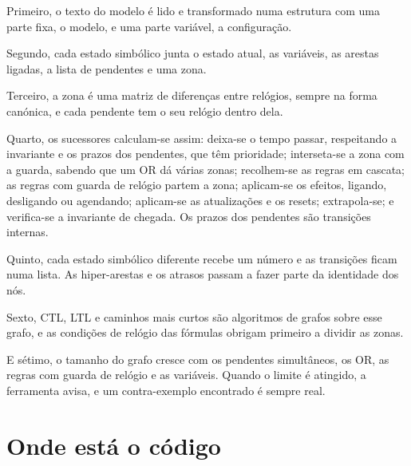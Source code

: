 \documentclass[11pt,a4paper]{article}
\begin{document}
Primeiro, o texto do modelo é lido e transformado numa estrutura com uma parte fixa, o modelo, e uma parte variável, a configuração.

Segundo, cada estado simbólico junta o estado atual, as variáveis, as arestas ligadas, a lista de pendentes e uma zona.

Terceiro, a zona é uma matriz de diferenças entre relógios, sempre na forma canónica, e cada pendente tem o seu relógio dentro dela.

Quarto, os sucessores calculam-se assim: deixa-se o tempo passar, respeitando a invariante e os prazos dos pendentes, que têm prioridade; interseta-se a zona com a guarda, sabendo que um OR dá várias zonas; recolhem-se as regras em cascata; as regras com guarda de relógio partem a zona; aplicam-se os efeitos, ligando, desligando ou agendando; aplicam-se as atualizações e os resets; extrapola-se; e verifica-se a invariante de chegada. Os prazos dos pendentes são transições internas.

Quinto, cada estado simbólico diferente recebe um número e as transições ficam numa lista. As hiper-arestas e os atrasos passam a fazer parte da identidade dos nós.

Sexto, CTL, LTL e caminhos mais curtos são algoritmos de grafos sobre esse grafo, e as condições de relógio das fórmulas obrigam primeiro a dividir as zonas.

E sétimo, o tamanho do grafo cresce com os pendentes simultâneos, os OR, as regras com guarda de relógio e as variáveis. Quando o limite é atingido, a ferramenta avisa, e um contra-exemplo encontrado é sempre real.

\appendix
\section{Onde está o código}
\end{document}
